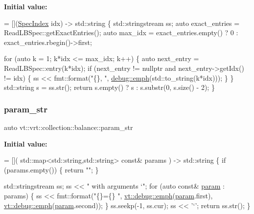 {\bfseries Initial value\+:}
\begin{DoxyCode}
= [](\hyperlink{namespacevt_1_1vrt_1_1collection_1_1balance_a72a5e0d9936ddf57f8e6c64e0e9fd123}{SpecIndex} idx) -> std::string \{
  std::stringstream ss;
  \textcolor{keyword}{auto} exact\_entries = ReadLBSpec::getExactEntries();
  \textcolor{keyword}{auto} max\_idx = exact\_entries.empty() ? 0 : exact\_entries.rbegin()->first;

  \textcolor{keywordflow}{for} (\textcolor{keyword}{auto} k = 1; k*idx <= max\_idx; k++) \{
    \textcolor{keyword}{auto} next\_entry = ReadLBSpec::entry(k*idx);
    \textcolor{keywordflow}{if} (next\_entry != \textcolor{keyword}{nullptr} and next\_entry->getIdx() != idx) \{
      ss << fmt::format(\textcolor{stringliteral}{"\{\}, "}, \hyperlink{namespacevt_1_1debug_add365336d7aa2053b5b7588ccad48ac7}{debug::emph}(std::to\_string(k*idx)));
    \}
  \}
  std::string s = ss.str();
  \textcolor{keywordflow}{return} s.empty() ? s : s.substr(0, s.size() - 2);
\}
\end{DoxyCode}
\mbox{\label{namespacevt_1_1vrt_1_1collection_1_1balance_aaed7e09146a45c2932ca185a55161723}} 
\subsubsection{\texorpdfstring{param\+\_\+str}{param\_str}}
{\footnotesize\ttfamily auto vt\+::vrt\+::collection\+::balance\+::param\+\_\+str}

{\bfseries Initial value\+:}
\begin{DoxyCode}
= [](
  std::map<std::string,std::string> \textcolor{keyword}{const}& params
) -> std::string \{
  \textcolor{keywordflow}{if} (params.empty()) \{
    \textcolor{keywordflow}{return} \textcolor{stringliteral}{""};
  \}

  std::stringstream ss;
  ss << \textcolor{stringliteral}{" with arguments `"};
  \textcolor{keywordflow}{for} (\textcolor{keyword}{auto} \textcolor{keyword}{const}& \hyperlink{namespacevt_1_1config_a6bd1d6215bda0d8ca02811798399f689ab9f079503fc8bbc11679d6dd6d2a2d16}{param} : params) \{
    ss << fmt::format(\textcolor{stringliteral}{"\{\}=\{\} "},
      \hyperlink{namespacevt_1_1debug_add365336d7aa2053b5b7588ccad48ac7}{vt::debug::emph}(\hyperlink{namespacevt_1_1config_a6bd1d6215bda0d8ca02811798399f689ab9f079503fc8bbc11679d6dd6d2a2d16}{param}.first),
      \hyperlink{namespacevt_1_1debug_add365336d7aa2053b5b7588ccad48ac7}{vt::debug::emph}(\hyperlink{namespacevt_1_1config_a6bd1d6215bda0d8ca02811798399f689ab9f079503fc8bbc11679d6dd6d2a2d16}{param}.second));
  \}
  ss.seekp(-1, ss.cur);
  ss << \textcolor{charliteral}{'`'};
  \textcolor{keywordflow}{return} ss.str();
\}
\end{DoxyCode}

